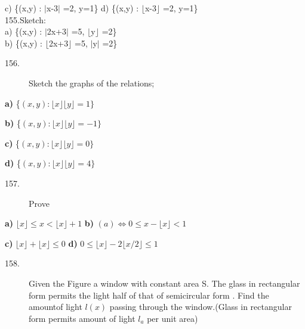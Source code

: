 \documentclass[11pt]{amsbook}
\begin{document}
\hspace{1 cm} c) \{(x,y) :  $\rvert$x-3$\rvert$ =2, y=1\}  d) \{(x,y) :  $\lfloor$x-3$\rfloor$ =2, y=1\} \\

155.Sketch: \\

\hspace{1 cm} a) \{(x,y) : $\rvert$2x+3$\rvert$ =5, $\lfloor$y$\rfloor$ =2\}  \\

\hspace{1 cm} b) \{(x,y) : $\lfloor$2x+3$\rfloor$ =5, $\rvert$y$\rvert$ =2\}  \\

\begin{description}
\item[156.] Sketch the graphs of the relations;
\end{description}

\textbf{a)} \{$( x,y ):  \lfloor x \rfloor  \lfloor y \rfloor  = 1 \}$

\textbf{b)} \{$( x,y ):  \lfloor x \rfloor  \lfloor y \rfloor  = -1 \}$

\textbf{c)} \{$( x,y ):  \lfloor x \rfloor  \lfloor y \rfloor  = 0 \}$

\textbf{d)} \{$( x,y ):  \lfloor x \rfloor  \lfloor y \rfloor  = 4 \}$



\begin{description}
\item[157.] Prove
\end{description}


\textbf{a)}  $ \lfloor x \rfloor \leq  x  < \lfloor x \rfloor + 1 $ 
\hspace*{1in} \textbf{b)} $ (a) \Leftrightarrow 0 \le x - \lfloor x \rfloor < 1 $

\textbf{c)} $ \lfloor x \rfloor + \lfloor x \rfloor \le 0 $
\hspace{92pt} \textbf{d)} $ 0 \le \lfloor x \rfloor-2 \lfloor x/2 \rfloor \le 1 $

\begin{description}
\item[158.] Given the Figure a window with constant area S. The glass in rectangular 
form permits the light half of that of semicircular form . Find the amountof light 
$ l(x)$ passing through the window.(Glass in rectangular form permits amount of light $l_a$ per unit area)
\end{description}
\end{document}
